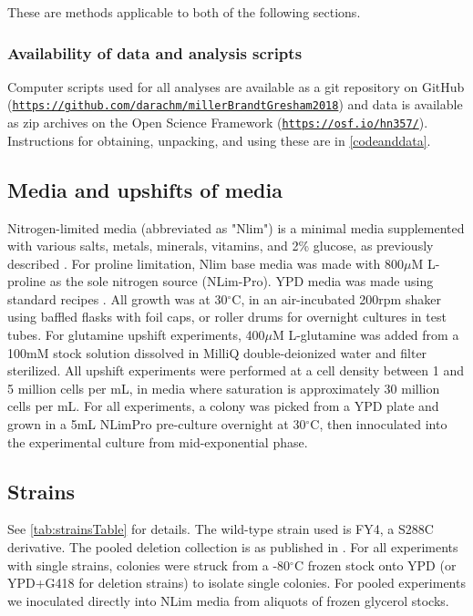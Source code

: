 These are methods applicable to both of the following sections.

\subsubsection{Availability of data and analysis scripts}

Computer scripts used for all analyses are available as a git repository
on GitHub
(\texttt{\url{https://github.com/darachm/millerBrandtGresham2018}})
and data is available as zip archives on the Open Science
Framework (\texttt{\url{https://osf.io/hn357/}}).
Instructions for obtaining, unpacking, and using these are in
\autoref{codeanddata}.

\subsection{Media and upshifts of media}

Nitrogen-limited media (abbreviated as "Nlim") is a minimal media
supplemented with various salts, metals, minerals, vitamins, and
2\% glucose, as previously described
\parencite{airoldi2016steady,brauer2008coordination}. 
For proline limitation, 
Nlim base media was made with 800$\mu$M L-proline as the sole
nitrogen source (NLim-Pro).
YPD media was made using standard recipes \parencite{amberg2005methods}.
All growth was at 30$^{\circ}$C, in an air-incubated 200rpm shaker  
using baffled flasks with foil caps, or roller drums for 
overnight cultures in test tubes.
For glutamine upshift experiments, 
400$\mu$M L-glutamine was added from a 100mM stock solution dissolved 
in MilliQ double-deionized water and filter sterilized.
All upshift experiments were
performed at a cell density between 1 and 5 million cells per mL,
in media where saturation is approximately 30 million cells per mL. 
For all experiments, 
a colony was picked from a YPD plate and grown in a 5mL NLimPro 
pre-culture overnight at 30$^{\circ}$C, then innoculated into
the experimental culture from mid-exponential phase.

\subsection{Strains}

See \autoref{tab:strainsTable} for details.  
The wild-type strain used is FY4, a S288C derivative. 
The pooled deletion collection is as published in 
\cite{vandersluis2014broad}.
For all experiments with single strains, colonies were struck 
from a -80$^{\circ}$C frozen stock onto YPD (or YPD+G418 for
deletion strains) to isolate single colonies.
For pooled experiments we inoculated directly into NLim media
from aliquots of frozen glycerol stocks.

